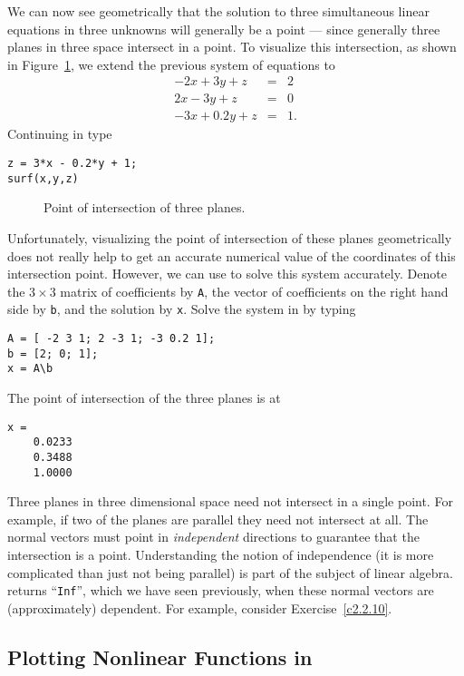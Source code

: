 \documentclass{ximera}
\begin{document}
We can now see geometrically that the solution to three
simultaneous linear equations in three unknowns will generally
be a point --- since generally three planes in three space
intersect in a point.  To visualize this intersection, as shown in
Figure~\ref{F:p3int}, we extend the previous system of equations to
\begin{eqnarray*}
-2x +   3y + z & = & 2 \\
 2x -   3y + z & = & 0\\
-3x + 0.2y + z & = & 1.
\end{eqnarray*}
Continuing in \Matlab type
\begin{verbatim}
z = 3*x - 0.2*y + 1;
surf(x,y,z)
\end{verbatim}

\begin{figure}[htb]
              \centerline{%
              }
              \caption{Point of intersection of three planes.}
              \label{F:p3int}
\end{figure}

Unfortunately, visualizing the point of intersection of these
planes geometrically does not really help to get an accurate
numerical value of the coordinates of this intersection point.  
However, we can use \Matlab to solve this system accurately.
Denote the $3\times 3$ matrix of coefficients by {\tt A}, the 
vector of coefficients on the right hand side by {\tt b}, and 
the solution by {\tt x}.  Solve the system in \Matlab by typing
\begin{verbatim}
A = [ -2 3 1; 2 -3 1; -3 0.2 1];
b = [2; 0; 1];
x = A\b
\end{verbatim}
The point of intersection of the three planes is at
\begin{verbatim}
x =
    0.0233
    0.3488
    1.0000
\end{verbatim}

Three planes in three dimensional space need not intersect in a
single point.  For example, if two of the planes are parallel
they need not intersect at all.  The normal vectors must point
in {\em independent\/} directions to
guarantee that the intersection is a point.  Understanding the
notion of independence (it is more complicated than just not
being parallel) is part of the subject of linear algebra.
\Matlab returns ``{\tt Inf}'', which we have seen previously,
when these normal vectors are (approximately) dependent. For
example, consider Exercise~\ref{c2.2.10}.

\subsection*{Plotting Nonlinear Functions in \Matlab}
\end{document}
